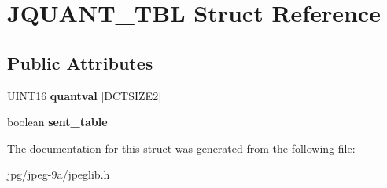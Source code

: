 \hypertarget{struct_j_q_u_a_n_t___t_b_l}{\section{J\+Q\+U\+A\+N\+T\+\_\+\+T\+B\+L Struct Reference}
\label{struct_j_q_u_a_n_t___t_b_l}
}
\subsection*{Public Attributes}
\begin{DoxyCompactItemize}
\item 
\hypertarget{struct_j_q_u_a_n_t___t_b_l_ab5b5150e73282a62ca7dc0f7e2fac944}{U\+I\+N\+T16 {\bfseries quantval} \mbox{[}D\+C\+T\+S\+I\+Z\+E2\mbox{]}}\label{struct_j_q_u_a_n_t___t_b_l_ab5b5150e73282a62ca7dc0f7e2fac944}

\item 
\hypertarget{struct_j_q_u_a_n_t___t_b_l_a218b782157eccfbd22023ae6bb4cc7fa}{boolean {\bfseries sent\+\_\+table}}\label{struct_j_q_u_a_n_t___t_b_l_a218b782157eccfbd22023ae6bb4cc7fa}

\end{DoxyCompactItemize}


The documentation for this struct was generated from the following file\+:\begin{DoxyCompactItemize}
\item 
jpg/jpeg-\/9a/jpeglib.\+h\end{DoxyCompactItemize}
